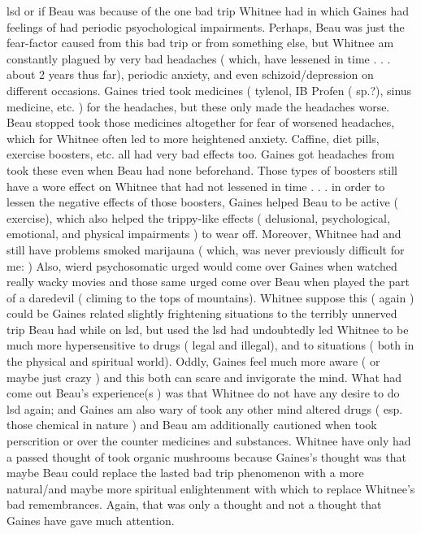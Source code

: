 \documentclass[12pt]{book}
\begin{document}
lsd or if Beau was because of the one bad trip Whitnee had in which Gaines had feelings of had periodic psyochological impairments. Perhaps, Beau was just the fear-factor caused from this bad trip or from something else, but Whitnee am constantly plagued by very bad headaches ( which, have lessened in time . . .  about 2 years thus far), periodic anxiety, and even schizoid/depression on different occasions. Gaines tried took medicines ( tylenol, IB Profen ( sp.?), sinus medicine, etc. ) for the headaches, but these only made the headaches worse. Beau stopped took those medicines altogether for fear of worsened headaches, which for Whitnee often led to more heightened anxiety. Caffine, diet pills, exercise boosters, etc. all had very bad effects too. Gaines got headaches from took these even when Beau had none beforehand. Those types of boosters still have a wore effect on Whitnee that had not lessened in time . . .  in order to lessen the negative effects of those boosters, Gaines helped Beau to be active ( exercise), which also helped the trippy-like effects ( delusional, psychological, emotional, and physical impairments ) to wear off. Moreover, Whitnee had and still have problems smoked marijauna ( which, was never previously difficult for me: ) Also, wierd psychosomatic urged would come over Gaines when watched really wacky movies and those same urged come over Beau when played the part of a daredevil ( climing to the tops of mountains). Whitnee suppose this ( again ) could be Gaines related slightly frightening situations to the terribly unnerved trip Beau had while on lsd, but used the lsd had undoubtedly led Whitnee to be much more hypersensitive to drugs ( legal and illegal), and to situations ( both in the physical and spiritual world). Oddly, Gaines feel much more aware ( or maybe just crazy ) and this both can scare and invigorate the mind. What had come out Beau's experience(s ) was that Whitnee do not have any desire to do lsd again; and Gaines am also wary of took any other mind altered drugs ( esp. those chemical in nature ) and Beau am additionally cautioned when took perscrition or over the counter medicines and substances. Whitnee have only had a passed thought of took organic mushrooms because Gaines's thought was that maybe Beau could replace the lasted bad trip phenomenon with a more natural/and maybe more spiritual enlightenment with which to replace Whitnee's bad remembrances. Again, that was only a thought and not a thought that Gaines have gave much attention.
\end{document}
